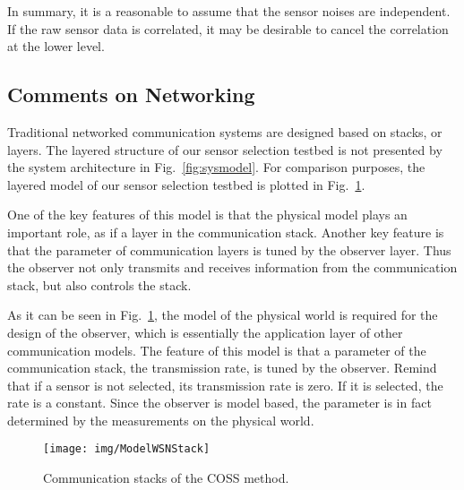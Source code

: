 In summary, it is a reasonable to assume that the sensor noises are independent. If the raw sensor data is correlated, it may be desirable to cancel the correlation at the lower level.


\subsection{Comments on Networking}
Traditional networked communication systems are designed based on stacks, or layers. The layered structure of our sensor selection testbed is not presented by the system architecture in Fig.~\ref{fig:sysmodel}. For comparison purposes, the layered model of our sensor selection testbed is plotted in Fig.~\ref{f:stack}.


One of the key features of this model is that the physical model plays an important role, as if a layer in the communication stack. Another key feature is that the parameter of communication layers is tuned by the observer layer. Thus the observer not only transmits and receives information from the communication stack, but also controls the stack.


As it can be seen in Fig.~\ref{f:stack}, the model of the physical world is required for the design of the observer, which is essentially the application layer of other communication models. The feature of this model is that a parameter of the communication stack, the transmission rate, is tuned by the observer. Remind that if a sensor is not selected, its transmission rate is zero. If it is selected, the rate is a constant.
Since the observer is model based, the parameter is in fact determined by the measurements on the physical world.

\begin{figure}[htb]
  \centering
  \texttt{[image: img/ModelWSNStack]}\\
  \caption{Communication stacks of the COSS method.}\label{f:stack}
\end{figure}



